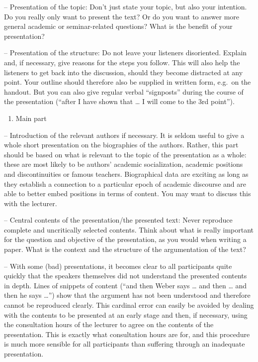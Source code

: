 \documentclass[
  english,
]{scrreprt}
\providecommand{\tightlist}{%
  \setlength{\itemsep}{0pt}\setlength{\parskip}{0pt}}
\begin{document}
– Presentation of the topic: Don’t just state your topic, but also your intention. Do you really only want to present the text? Or do you want to answer more general academic or seminar-related questions? What is the benefit of your presentation?

– Presentation of the structure: Do not leave your listeners disoriented. Explain and, if necessary, give reasons for the steps you follow. This will also help the listeners to get back into the discussion, should they become distracted at any point. Your outline should therefore also be supplied in written form, e.g.~on the handout. But you can also give regular verbal “signposts” during the course of the presentation (“after I have shown that … I will come to the 3rd point”).

\begin{enumerate}
\def\labelenumi{\arabic{enumi}.}
\setcounter{enumi}{1}
\tightlist
\item
  Main part
\end{enumerate}

– Introduction of the relevant authors if necessary. It is seldom useful to give a whole short presentation on the biographies of the authors. Rather, this part should be based on what is relevant to the topic of the presentation as a whole: these are most likely to be authors’ academic socialization, academic positions and discontinuities or famous teachers. Biographical data are exciting as long as they establish a connection to a particular epoch of academic discourse and are able to better embed positions in terms of content. You may want to discuss this with the lecturer.

– Central contents of the presentation/the presented text: Never reproduce complete and uncritically selected contents. Think about what is really important for the question and objective of the presentation, as you would when writing a paper. What is the context and the structure of the argumentation of the text?

– With some (bad) presentations, it becomes clear to all participants quite quickly that the speakers themselves did not understand the presented contents in depth. Lines of snippets of content (“and then Weber says … and then … and then he says …”) show that the argument has not been understood and therefore cannot be reproduced clearly. This cardinal error can easily be avoided by dealing with the contents to be presented at an early stage and then, if necessary, using the consultation hours of the lecturer to agree on the contents of the presentation. This is exactly what consultation hours are for, and this procedure is much more sensible for all participants than suffering through an inadequate presentation.
\end{document}
